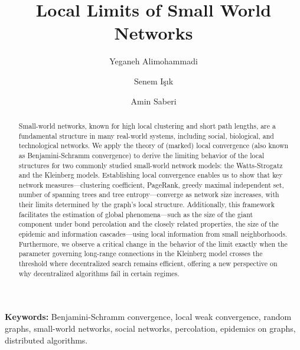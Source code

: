 \documentclass[10pt]{amsart}
\begin{document}
\title{Local Limits of Small World Networks}

\author[Y. Alimohammadi]{Yeganeh Alimohammadi}
\address{Marshall School of Business, University of Southern California}

\author[S. I\c{s}\i k]{Senem I\c{s}\i k}
\address{Management Science and Engineering, Stanford University}

\author[A. Saberi]{Amin Saberi}
\address{Management Science and Engineering, Stanford University}

\begin{abstract}
Small-world networks, known for high local clustering and short path lengths, are a fundamental structure in many real-world systems, including social, biological, and technological networks. We apply the theory of (marked) local convergence (also known as Benjamini-Schramm convergence) to derive the limiting behavior of the local structures for two commonly studied small-world network models: the Watts-Strogatz and the Kleinberg models. Establishing local convergence enables us to show that key network measures---clustering coefficient, PageRank, greedy maximal independent set, number of spanning trees and tree entropy---converge as network size increases, with their limits determined by the graph's local structure. Additionally, this framework facilitates the estimation of global phenomena---such as the size of the giant component under bond percolation and the closely related properties, the size of the epidemic and information cascades---using local information from small neighborhoods. Furthermore, we observe a critical change in the behavior of the limit exactly when the parameter governing long-range connections in the Kleinberg model crosses the threshold where decentralized search remains efficient, offering a new perspective on why decentralized algorithms fail in certain regimes.
\end{abstract}

\maketitle
{\small{\textbf{Keywords:} Benjamini-Schramm convergence, local weak convergence, random graphs, small-world networks, social networks, percolation, epidemics on graphs, distributed algorithms.}}
\end{document}
